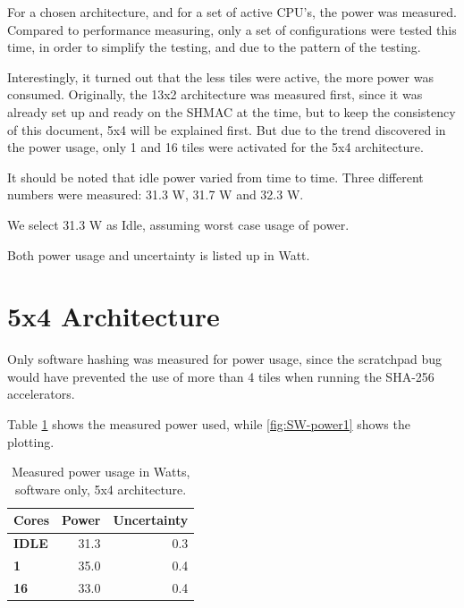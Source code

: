 \begin{appendix}
For a chosen architecture, and for a set of active CPU's, the power was measured.
Compared to performance measuring, only a set of configurations were tested this time, in order to simplify the testing, and due to the pattern of the testing.

Interestingly, it turned out that the less tiles were active, the more power was consumed.
Originally, the 13x2 architecture was measured first, since it was already set up and ready on the SHMAC at the time, but to keep the consistency of this document, 5x4 will be explained first.
But due to the trend discovered in the power usage, only 1 and 16 tiles were activated for the 5x4 architecture.

It should be noted that idle power varied from time to time.
Three different numbers were measured:
31.3 W, 31.7 W and 32.3 W.

We select 31.3 W as Idle, assuming worst case usage of power.

Both power usage and uncertainty is listed up in Watt.

\section{5x4 Architecture}
 
Only software hashing was measured for power usage, since the scratchpad bug would have prevented the use of more than 4 tiles when running the SHA-256 accelerators.

Table \ref{tab:SW-power1} shows the measured power used, while \ref{fig:SW-power1} shows the plotting.

\begin{table}
\begin{tabular}{| l | r | r |}
  \hline 
  \textbf{Cores} & \textbf{Power} & \textbf{Uncertainty} \\
  \hline                       
  \textbf{IDLE} &  31.3 & 0.3 \\
  \textbf{1} &  35.0 & 0.4\\
  \textbf{16} &  33.0 & 0.4 \\
  \hline 
\end{tabular}
\caption{Measured power usage in Watts, software only, 5x4 architecture.}
\label{tab:SW-power1}
\end{table}

\begin{figure}
\end{figure}
\end{appendix}
